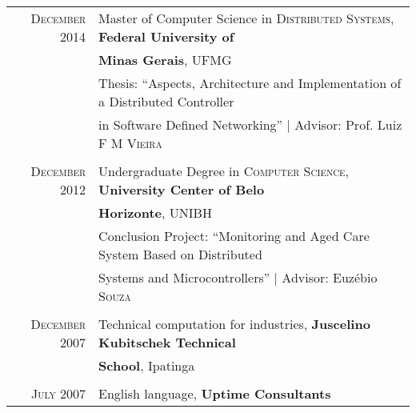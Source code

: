\documentclass[a4paper,10pt]{article} %
\begin{document}
\begin{tabular}{rl}
\textsc{December} 2014 & Master of Computer Science in
\textsc{Distributed Systems},  \textbf{Federal University of}
\\ & \textbf{Minas Gerais}, UFMG \\
& Thesis: ``Aspects, Architecture and Implementation of a Distributed
Controller \\ & in Software Defined Networking''
| \small Advisor: Prof. Luiz \textsc{F M Vieira} \\
&\\


\textsc{December} 2012& Undergraduate Degree in
\textsc{}\textsc{Computer Science},
\normalsize\textbf{ University Center of Belo}
\\ & \textbf{Horizonte}, UNIBH \\
& Conclusion Project: ``Monitoring and Aged Care System Based on
Distributed
\\ & Systems and Microcontrollers''
| \small Advisor: Euzébio \textsc{Souza} \\
&\\


\textsc{December} 2007 &Technical computation for industries,
\textbf{Juscelino Kubitschek Technical}
\\ & \textbf{School}, Ipatinga \\
&\\


\textsc{July} 2007 & English language, \textbf{Uptime Consultants}
\end{tabular}
\end{document}
